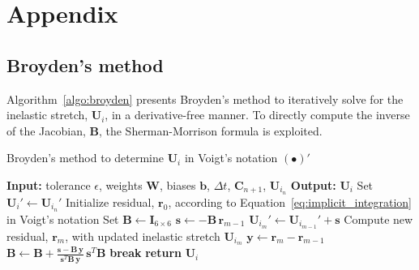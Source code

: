 \section{Appendix}
\subsection{Broyden's method}
\label{app:broyden}
%
Algorithm~\ref{algo:broyden} presents Broyden's method \cite{broyden1965} to iteratively solve for the inelastic stretch, $\bm{U}_i$, in a derivative-free manner. 
To directly compute the inverse of the Jacobian, $\mathbf{B}$, the Sherman-Morrison formula \cite{sherman1950} is exploited.
%
\begin{algorithm}[h]
\caption{Broyden's method to determine $\bm{U}_i$ in Voigt's notation $(\bullet)'$}
\label{algo:broyden}
\begin{algorithmic}[1]
\State \textbf{Input:} tolerance \( \epsilon \), weights $\mathbf{W}$, biases $\mathbf{b}$, $\Delta t$, $\bm{C}_{n+1}$, $\bm{U}_{i_n}$
\State \textbf{Output:} $\bm{U}_i$
\State Set \( \bm{U}_i' \gets \bm{U}_{i_n}'\)
\State Initialize residual, $\mathbf{r}_0$, according to Equation~\eqref{eq:implicit_integration} in Voigt's notation
\State Set \( \mathbf{B} \gets \mathbf{I}_{6\times 6}\)
    \State $\mathbf{s} \gets -  \mathbf{B}\, \mathbf{r}_{m-1}$ 
    \State $\bm{U}_{i_m}' \gets \bm{U}_{i_{m-1}}' + \mathbf{s}$
    \State Compute new residual, $\mathbf{r}_m$, with updated inelastic stretch $\bm{U}_{i_m}$
    \State $\mathbf{y} \gets \mathbf{r}_m - \mathbf{r}_{m-1}$
    \State $\mathbf{B} \gets \mathbf{B} + \frac{\mathbf{s} - \mathbf{B}\,\mathbf{y}}{\mathbf{s}^T\mathbf{B}\,\mathbf{y}}\, \mathbf{s}^T\mathbf{B}$
        \State \textbf{break}
    \EndIf   
\EndFor
\State \textbf{return} $\bm{U}_i$
\end{algorithmic}
\end{algorithm}
%
\FloatBarrier
%

